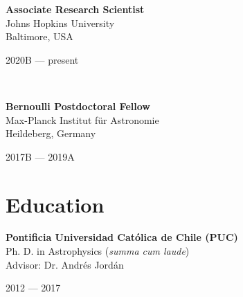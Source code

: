 \documentclass[12pt, a4paper]{article} %
\begin{document}
\begin{minipage}[t]{0.6\textwidth}
\begin{flushleft}%
  \setlength{\leftskip}{0.2cm}%
\textbf{Associate Research Scientist}\\
Johns Hopkins University\\
Baltimore, USA
 
\end{flushleft}
\end{minipage}
\begin{minipage}[t]{0.4\textwidth}
\hfill 2020B --- present 
\end{minipage}\\

\begin{minipage}[t]{0.6\textwidth}
\begin{flushleft}%
  \setlength{\leftskip}{0.2cm}%
\textbf{Bernoulli Postdoctoral Fellow}\\
Max-Planck Institut f\"ur Astronomie\\
Heildeberg, Germany
 
\end{flushleft}
\end{minipage}
\begin{minipage}[t]{0.4\textwidth}
\hfill 2017B --- 2019A 
\end{minipage}

\section*{Education}


\begin{minipage}[t]{0.6\textwidth}
\begin{flushleft}%
  \setlength{\leftskip}{0.2cm}%
\textbf{Pontificia Universidad Cat\'olica de Chile (PUC)}\\
Ph. D. in Astrophysics (\textit{summa cum laude})\\
Advisor: Dr. Andr\'es Jord\'an
 
\end{flushleft}
\end{minipage}
\begin{minipage}[t]{0.4\textwidth}
\hfill 2012 --- 2017 
\end{minipage}\\
\end{document}
